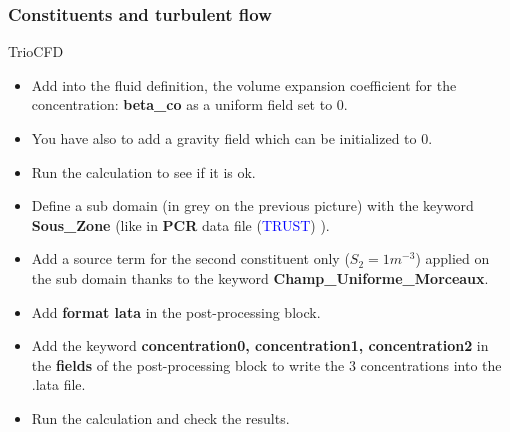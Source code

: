 \documentclass[10pt, hyperref={unicode=true,pdfusetitle, bookmarks=true,bookmarksnumbered=false,bookmarksopen=false, breaklinks=false,pdfborder={0 0l 1},backref=true,colorlinks=true,linkcolor=darkblue,pageanchor}]{beamer}
\begin{document}
\begin{frame}
\frametitle{Constituents and turbulent flow}
\begin{block}{TrioCFD}

\begin{itemize}

\item Add into the fluid definition, the volume expansion coefficient for the concentration: \textbf{beta\_co} as a uniform field set to 0.

\item You have also to add a gravity field which can be initialized to 0.

\item Run the calculation to see if it is ok.

\item Define a sub domain (in grey on the previous picture) with the keyword \textbf{Sous\_Zone} (like in \textbf{PCR} data file (\textcolor{blue}{TRUST}) ).

\item Add a source term for the second constituent only ($S_2=1m^{-3}$) applied on the sub domain thanks to the keyword \textbf{Champ\_Uniforme\_Morceaux}.

\item Add \textbf{format lata} in the post-processing block.

\item Add the keyword \textbf{concentration0, concentration1, concentration2} in the \textbf{fields} of the post-processing block to write the 3 concentrations into the .lata file.

\item Run the calculation and check the results.
\end{itemize}

\end{block}
\end{frame}
\end{document}
